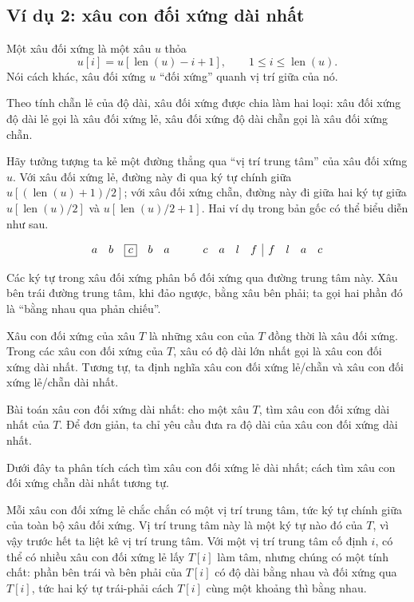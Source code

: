 \documentclass[11pt]{article}
\newcommand{\Len}{\operatorname{len}}
\begin{document}
\subsection{Ví dụ 2: xâu con đối xứng dài nhất}

Một xâu đối xứng là một xâu \(u\) thỏa
\[
  u[i]=u[\Len(u)-i+1],\qquad
  1\le i\le \Len(u).
\]
Nói cách khác, xâu đối xứng \(u\) ``đối xứng'' quanh vị trí giữa của nó.

Theo tính chẵn lẻ của độ dài, xâu đối xứng được chia làm hai loại: xâu đối
xứng độ dài lẻ gọi là xâu đối xứng lẻ, xâu đối xứng độ dài chẵn gọi là xâu
đối xứng chẵn.

Hãy tưởng tượng ta kẻ một đường thẳng qua ``vị trí trung tâm'' của xâu đối
xứng \(u\). Với xâu đối xứng lẻ, đường này đi qua ký tự chính giữa
\(u[(\Len(u)+1)/2]\); với xâu đối xứng chẵn, đường này đi giữa hai ký tự giữa
\(u[\Len(u)/2]\) và \(u[\Len(u)/2+1]\). Hai ví dụ trong bản gốc có thể biểu
diễn như sau.

\[
\begin{array}{c c c c c}
a & b & \boxed{c} & b & a
\end{array}
\qquad
\begin{array}{c c c c|c c c c}
c & a & l & f & f & l & a & c
\end{array}
\]

Các ký tự trong xâu đối xứng phân bố đối xứng qua đường trung tâm này. Xâu
bên trái đường trung tâm, khi đảo ngược, bằng xâu bên phải; ta gọi hai phần
đó là ``bằng nhau qua phản chiếu''.

Xâu con đối xứng của xâu \(T\) là những xâu con của \(T\) đồng thời là xâu
đối xứng. Trong các xâu con đối xứng của \(T\), xâu có độ dài lớn nhất gọi là
xâu con đối xứng dài nhất. Tương tự, ta định nghĩa xâu con đối xứng lẻ/chẵn
và xâu con đối xứng lẻ/chẵn dài nhất.

Bài toán xâu con đối xứng dài nhất: cho một xâu \(T\), tìm xâu con đối xứng
dài nhất của \(T\). Để đơn giản, ta chỉ yêu cầu đưa ra độ dài của xâu con đối
xứng dài nhất.

Dưới đây ta phân tích cách tìm xâu con đối xứng lẻ dài nhất; cách tìm xâu con
đối xứng chẵn dài nhất tương tự.

Mỗi xâu con đối xứng lẻ chắc chắn có một vị trí trung tâm, tức ký tự chính
giữa của toàn bộ xâu đối xứng. Vị trí trung tâm này là một ký tự nào đó của
\(T\), vì vậy trước hết ta liệt kê vị trí trung tâm. Với một vị trí trung tâm
cố định \(i\), có thể có nhiều xâu con đối xứng lẻ lấy \(T[i]\) làm tâm,
nhưng chúng có một tính chất: phần bên trái và bên phải của \(T[i]\) có độ
dài bằng nhau và đối xứng qua \(T[i]\), tức hai ký tự trái-phải cách \(T[i]\)
cùng một khoảng thì bằng nhau.
\end{document}

